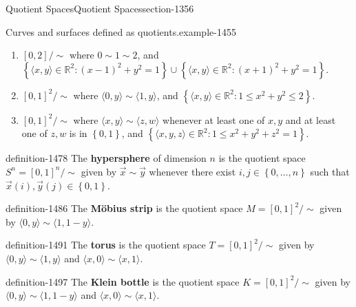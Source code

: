 \documentclass[oneside,10pt,]{article}
\newcommand{\terminology}[1]{\textbf{#1}}
\newcommand{\tuple}[1]{\langle #1 \rangle}
\newcommand{\mb}{\mathbb}
\newcommand{\setBuilder}[2]{\left\{#1:#2\right\}}
\newcommand{\setList}[1]{\left\{#1\right\}}
\begin{document}
\begin{sectionptx}{Quotient Spaces}{}{Quotient Spaces}{}{}{section-1356}
\begin{example}{Curves and surfaces defined as quotients.}{example-1455}
\begin{enumerate}
\item\hypertarget{li-1463}{}\([0,2]/\sim\) where \(0\sim 1\sim 2\), and \(\setBuilder{\tuple{x,y}\in\mb R^2}{(x-1)^2+y^2=1}\cup\setBuilder{\tuple{x,y}\in\mb R^2}{(x+1)^2+y^2=1}\).%
\item\hypertarget{li-1467}{}\([0,1]^2/\sim\) where \(\tuple{0,y}\sim\tuple{1,y}\), and \(\setBuilder{\tuple{x,y}\in\mb R^2}{1\leq x^2+y^2\leq 2}\).%
\item\hypertarget{li-1471}{}\([0,1]^2/\sim\) where \(\tuple{x,y}\sim\tuple{z,w}\) whenever at least one of \(x,y\) and at least one of \(z,w\) is in \(\setList{0,1}\), and \(\setBuilder{\tuple{x,y,z}\in\mb R^2}{1\leq x^2+y^2+z^2=1}\).%
\end{enumerate}
\end{example}
\begin{definition}{}{definition-1478}%
\hypertarget{p-1479}{}%
The \terminology{hypersphere} of dimension \(n\) is the quotient space \(S^n=[0,1]^n/\sim\) given by \(\vec x\sim\vec y\) whenever there exist \(i,j\in\setList{0,\dots,n}\) such that \(\vec x(i),\vec y(j)\in\setList{0,1}\).%
\end{definition}
\begin{definition}{}{definition-1486}%
\hypertarget{p-1487}{}%
The \terminology{Möbius strip} is the quotient space \(M=[0,1]^2/\sim\) given by \(\tuple{0,y}\sim\tuple{1,1-y}\).%
\end{definition}
\begin{definition}{}{definition-1491}%
\hypertarget{p-1492}{}%
The \terminology{torus} is the quotient space \(T=[0,1]^2/\sim\) given by \(\tuple{0,y}\sim\tuple{1,y}\) and \(\tuple{x,0}\sim\tuple{x,1}\).%
\end{definition}
\begin{definition}{}{definition-1497}%
\hypertarget{p-1498}{}%
The \terminology{Klein bottle} is the quotient space \(K=[0,1]^2/\sim\) given by \(\tuple{0,y}\sim\tuple{1,1-y}\) and \(\tuple{x,0}\sim\tuple{x,1}\).%
\end{definition}
\end{sectionptx}
%
%
\typeout{************************************************}
\typeout{************************************************}
%
%
\appendix
%
\end{document}
